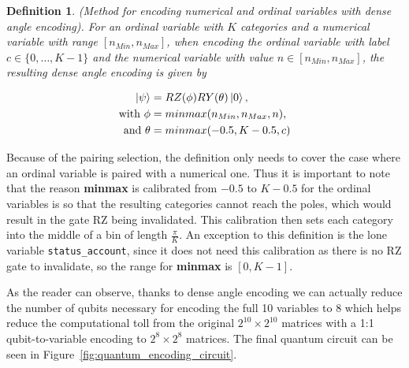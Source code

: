 \documentclass{ieeeaccess}
\newtheorem{definition}{Definition}[section]
\begin{document}
\begin{definition}
  (Method for encoding numerical and ordinal variables with dense angle encoding). For an ordinal variable with $K$ categories and a numerical variable with range $[n_{Min}, n_{Max}]$, when encoding the ordinal variable with label $c \in \{0, \dots, K-1\}$ and the numerical variable with value $n \in [n_{Min}, n_{Max}]$, the resulting dense angle encoding is given by
  
  \begin{align*}
    \ket{\psi} &= RZ(\phi)RY(\theta)\ket{0},\\
    \text{with } \phi &= minmax(n_{Min}, n_{Max}, n),\\
    \text{and } \theta &= minmax(-0.5, K - 0.5, c)
  \end{align*}
  \label{def:encoding_dense_angle}
\end{definition}

Because of the pairing selection, the definition only needs to cover the case where an ordinal variable is paired with a numerical one. Thus it is important to note that the reason \textbf{minmax} is calibrated from $-0.5$ to $K-0.5$ for the ordinal variables is so that the resulting categories cannot reach the poles, which would result in the gate RZ being invalidated. This calibration then sets each category into the middle of a bin of length $\frac{\pi}{K}$. An exception to this definition is the lone variable \texttt{status\_account}, since it does not need this calibration as there is no RZ gate to invalidate, so the range for \textbf{minmax} is $[0, K-1]$. 

As the reader can observe, thanks to dense angle encoding we can actually reduce the number of qubits necessary for encoding the full 10 variables to 8 which helps reduce the computational toll from the original $2^{10}\times 2^{10}$ matrices with a 1:1 qubit-to-variable encoding to $2^{8}\times 2^{8}$ matrices. The final quantum circuit can be seen in Figure~\ref{fig:quantum_encoding_circuit}.
\end{document}
